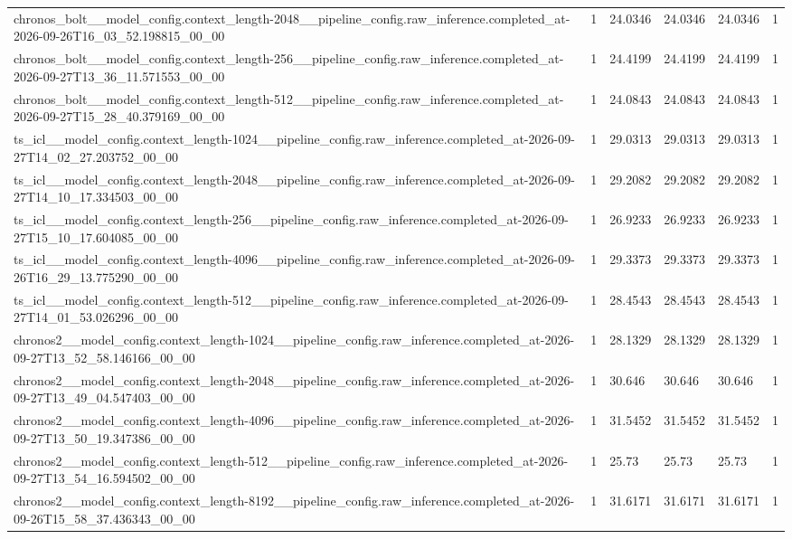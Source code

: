 \begin{tabular}{llllll}
chronos\_bolt\_\_model\_config.context\_length-2048\_\_pipeline\_config.raw\_inference.completed\_at-2026-09-26T16\_03\_52.198815\_00\_00 & 1 & 24.0346 & 24.0346 & 24.0346 & 1 \\
chronos\_bolt\_\_model\_config.context\_length-256\_\_pipeline\_config.raw\_inference.completed\_at-2026-09-27T13\_36\_11.571553\_00\_00 & 1 & 24.4199 & 24.4199 & 24.4199 & 1 \\
chronos\_bolt\_\_model\_config.context\_length-512\_\_pipeline\_config.raw\_inference.completed\_at-2026-09-27T15\_28\_40.379169\_00\_00 & 1 & 24.0843 & 24.0843 & 24.0843 & 1 \\
ts\_icl\_\_model\_config.context\_length-1024\_\_pipeline\_config.raw\_inference.completed\_at-2026-09-27T14\_02\_27.203752\_00\_00 & 1 & 29.0313 & 29.0313 & 29.0313 & 1 \\
ts\_icl\_\_model\_config.context\_length-2048\_\_pipeline\_config.raw\_inference.completed\_at-2026-09-27T14\_10\_17.334503\_00\_00 & 1 & 29.2082 & 29.2082 & 29.2082 & 1 \\
ts\_icl\_\_model\_config.context\_length-256\_\_pipeline\_config.raw\_inference.completed\_at-2026-09-27T15\_10\_17.604085\_00\_00 & 1 & 26.9233 & 26.9233 & 26.9233 & 1 \\
ts\_icl\_\_model\_config.context\_length-4096\_\_pipeline\_config.raw\_inference.completed\_at-2026-09-26T16\_29\_13.775290\_00\_00 & 1 & 29.3373 & 29.3373 & 29.3373 & 1 \\
ts\_icl\_\_model\_config.context\_length-512\_\_pipeline\_config.raw\_inference.completed\_at-2026-09-27T14\_01\_53.026296\_00\_00 & 1 & 28.4543 & 28.4543 & 28.4543 & 1 \\
chronos2\_\_model\_config.context\_length-1024\_\_pipeline\_config.raw\_inference.completed\_at-2026-09-27T13\_52\_58.146166\_00\_00 & 1 & 28.1329 & 28.1329 & 28.1329 & 1 \\
chronos2\_\_model\_config.context\_length-2048\_\_pipeline\_config.raw\_inference.completed\_at-2026-09-27T13\_49\_04.547403\_00\_00 & 1 & 30.646 & 30.646 & 30.646 & 1 \\
chronos2\_\_model\_config.context\_length-4096\_\_pipeline\_config.raw\_inference.completed\_at-2026-09-27T13\_50\_19.347386\_00\_00 & 1 & 31.5452 & 31.5452 & 31.5452 & 1 \\
chronos2\_\_model\_config.context\_length-512\_\_pipeline\_config.raw\_inference.completed\_at-2026-09-27T13\_54\_16.594502\_00\_00 & 1 & 25.73 & 25.73 & 25.73 & 1 \\
chronos2\_\_model\_config.context\_length-8192\_\_pipeline\_config.raw\_inference.completed\_at-2026-09-26T15\_58\_37.436343\_00\_00 & 1 & 31.6171 & 31.6171 & 31.6171 & 1 \\

\end{tabular}
